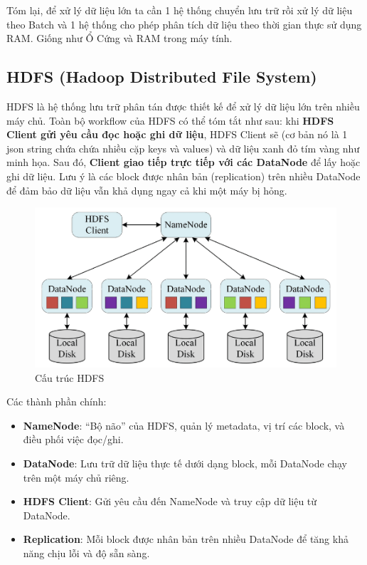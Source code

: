 \documentclass[11pt]{article}
\begin{document}
Tóm lại, để xử lý dữ liệu lớn ta cần 1 hệ thống chuyển lưu trữ rồi xử lý dữ liệu theo Batch và 1 hệ thống cho phép phân tích dữ liệu theo thời gian thực sử dụng RAM. Giống như Ổ Cứng và RAM trong máy tính.


\subsection{HDFS (Hadoop Distributed File System)}
HDFS là hệ thống lưu trữ phân tán được thiết kế để xử lý dữ liệu lớn trên nhiều máy chủ.
Toàn bộ workflow của HDFS có thể tóm tắt như sau: khi \textbf{HDFS Client gửi yêu cầu đọc hoặc ghi dữ liệu},
HDFS Client sẽ  (cơ bản nó là 1 json string chứa chứa nhiều cặp keys và values)
và  dữ liệu xanh đỏ tím vàng như minh họa. Sau đó, \textbf{Client giao tiếp trực tiếp với các DataNode}
để lấy hoặc ghi dữ liệu. Lưu ý là các block được nhân bản (replication) trên nhiều DataNode để đảm bảo dữ liệu vẫn khả dụng ngay cả khi một máy bị hỏng.

\begin{figure}[H]
    \centering
    \includegraphics[width=0.7\linewidth]{hdfs.png}
    \caption{Cấu trúc HDFS}
    \label{fig:hdfs-structure}
\end{figure}

\noindent Các thành phần chính:
\begin{itemize}
    \item \textbf{NameNode}: ``Bộ não'' của HDFS, quản lý metadata, vị trí các block, và điều phối việc đọc/ghi.
    \item \textbf{DataNode}: Lưu trữ dữ liệu thực tế dưới dạng block, mỗi DataNode chạy trên một máy chủ riêng.
    \item \textbf{HDFS Client}: Gửi yêu cầu đến NameNode và truy cập dữ liệu từ DataNode.
    \item \textbf{Replication}: Mỗi block được nhân bản trên nhiều DataNode để tăng khả năng chịu lỗi và độ sẵn sàng.
\end{itemize}
\end{document}

